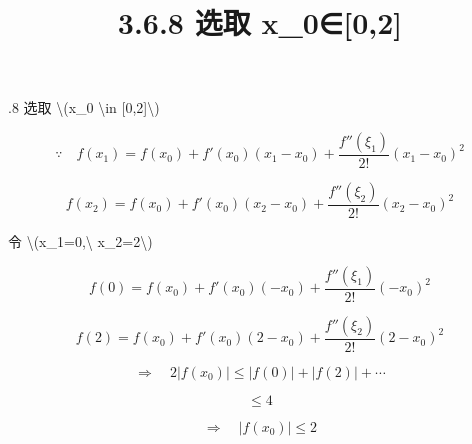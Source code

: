 \documentclass[UTF8,fontset=windows]{ctexart}
\title{3.6.8 选取 x\_0∈[0,2]}
\begin{document}
.8 选取 \textbackslash{}(x\_0 \textbackslash{}in [0,2]\textbackslash{})

\[
\because\quad f(x_1)=f(x_0)+f'(x_0)(x_1-x_0)+\frac{f''(\xi_1)}{2!}(x_1-x_0)^2
\]

\[
f(x_2)=f(x_0)+f'(x_0)(x_2-x_0)+\frac{f''(\xi_2)}{2!}(x_2-x_0)^2
\]

令 \textbackslash{}(x\_1=0,\textbackslash{} x\_2=2\textbackslash{})

\[
f(0)=f(x_0)+f'(x_0)(-x_0)+\frac{f''(\xi_1)}{2!}(-x_0)^2
\]

\[
f(2)=f(x_0)+f'(x_0)(2-x_0)+\frac{f''(\xi_2)}{2!}(2-x_0)^2
\]

\[
\Rightarrow\quad 2|f(x_0)|\le |f(0)|+|f(2)|+\cdots
\]

\[
\le 4
\]

\[
\Rightarrow\quad |f(x_0)|\le 2
\]

\newpage

\null
\end{document}
